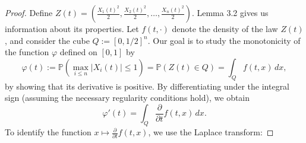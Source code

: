 \documentclass[12pt]{article}
\begin{document}
\begin{proof}
Define $Z(t) = \left( \frac{X_1(t)^2}{2}, \frac{X_2(t)^2}{2}, \dots, \frac{X_n(t)^2}{2} \right)$. Lemma 3.2 gives us information about its properties. Let $f(t, \cdot)$ denote the density of the law $Z(t)$, and consider the cube $Q := [0, 1/2]^n$. Our goal is to study the monotonicity of the function $\varphi$ defined on $[0, 1]$ by
\[
\varphi(t) := \mathbb{P}\left( \max_{i \leq n} |X_i(t)| \leq 1 \right) = \mathbb{P}\left( Z(t) \in Q \right) = \int_Q f(t, x) \, dx,
\]
by showing that its derivative is positive. By differentiating under the integral sign (assuming the necessary regularity conditions hold), we obtain
\[
\varphi'(t) = \int_Q \frac{\partial}{\partial t} f(t, x) \, dx.
\]
To identify the function $x \mapsto \frac{\partial}{\partial t} f(t, x)$, we use the Laplace transform:


\end{proof}
\end{document}

